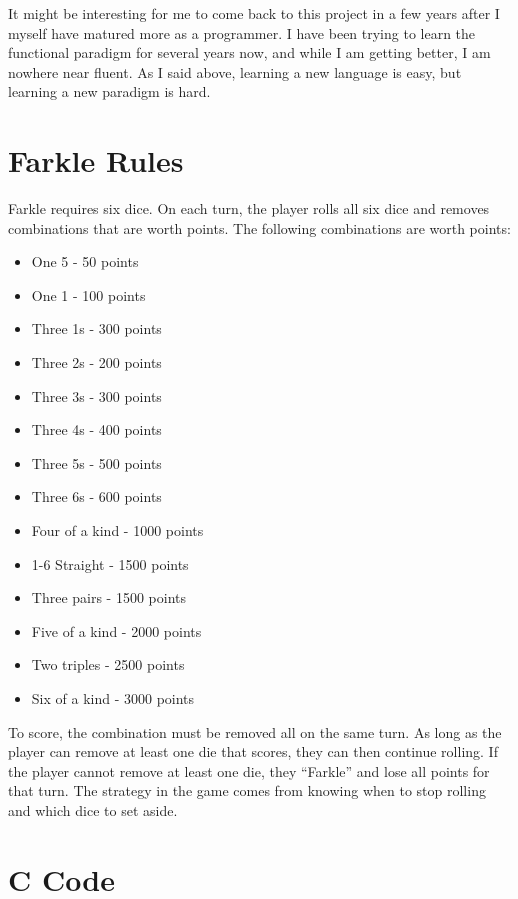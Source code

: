 \documentclass{article}
\begin{document}
It might be interesting for me to come back to this project in a few years after
I myself have matured more as a programmer.  I have been trying to learn the
functional paradigm for several years now, and while I am getting better, I am
nowhere near fluent.  As I said above, learning a new language is easy, but
learning a new paradigm is hard.




\appendix
\section{Farkle Rules}
\label{sec:farklerules}

Farkle requires six dice.  On each turn, the player rolls all six dice and
removes combinations that are worth points.  The following combinations are
worth points:

\begin{itemize}
\item One 5 - 50 points
\item One 1 - 100 points
\item Three 1s - 300 points
\item Three 2s - 200 points
\item Three 3s - 300 points
\item Three 4s - 400 points
\item Three 5s - 500 points
\item Three 6s - 600 points
\item Four of a kind - 1000 points
\item 1-6 Straight   - 1500 points
\item Three pairs    - 1500 points
\item Five of a kind - 2000 points
\item Two triples    - 2500 points
\item Six of a kind  - 3000 points
\end{itemize}

To score, the combination must be removed all on the same turn.  As long as the
player can remove at least one die that scores, they can then continue rolling.
If the player cannot remove at least one die, they ``Farkle'' and lose all
points for that turn.  The strategy in the game comes from knowing when to stop
rolling and which dice to set aside.

\section{C Code}
\end{document}
